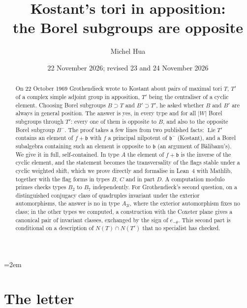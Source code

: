 \documentclass[11pt,a4paper]{amsart}
\title[Kostant's tori in apposition]{Kostant's tori in apposition:\\ the Borel subgroups are opposite}
\author{Michel Hua}
\date{22 November 2026; revised 23 and 24 November 2026}
\theoremstyle{definition}
\theoremstyle{remark}
\begin{document}
\emergencystretch=2em
\begin{abstract}
On 22 October 1969 Grothendieck wrote to Kostant about pairs of maximal tori $T$, $T'$ of a complex simple adjoint group in apposition, $T'$ being the centraliser of a cyclic element. Choosing Borel subgroups $B \supset T$ and $B' \supset T'$, he asked whether $B$ and $B'$ are always in general position. The answer is yes, in every type and for all $|W|$ Borel subgroups through $T'$: every one of them is opposite to $B$, and also to the opposite Borel subgroup $B^-$. The proof takes a few lines from two published facts: $\operatorname{Lie}T'$ contains an element of $f + \mathfrak b$ with $f$ a principal nilpotent of $\mathfrak b^-$ (Kostant), and a Borel subalgebra containing such an element is opposite to $\mathfrak b$ (an argument of B\u{a}libanu's). We give it in full, self-contained. In type $A$ the element of $f+\mathfrak b$ is the inverse of the cyclic element, and the statement becomes the transversality of the flags stable under a cyclic weighted shift, which we prove directly and formalise in Lean~4 with Mathlib, together with the flag forms in types $B$, $C$ and in part $D$. A computation modulo primes checks types $B_2$ to $B_7$ independently. For Grothendieck's second question, on a distinguished conjugacy class of quadruples invariant under the exterior automorphisms, the answer is no in type $A_{2l}$, where the exterior automorphism fixes no class; in the other types we computed, a construction with the Coxeter plane gives a canonical pair of invariant classes, exchanged by the sign of $e_{-\theta}$. This second part is conditional on a description of $N(T)\cap N(T')$ that no specialist has checked.
\end{abstract}
\maketitle

\section{The letter}\label{sec:letter}
\end{document}
